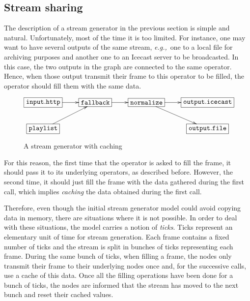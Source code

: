\documentclass{llncs}
\newcommand{\eg}{{\em e.g.,}}
\begin{document}
\subsection*{Stream sharing}

The description of a stream generator in the previous section is simple and 
natural. Unfortunately, most of the time it is too limited. For instance, one 
may want to have several outputs of the same 
stream, \eg\ one to a local file for archiving purposes and another one to an Icecast server to be
broadcasted.
In this case, the two outputs in the graph are connected to the same operator. Hence, when those output
transmit their frame to this operator to be filled, the operator should fill them with the same data.

\begin{figure}[htn]
 \begin{center}
\[
\xymatrix{
  *+[F]{\mathtt{input.http}}\ar[r]&*+[F]{\mathtt{fallback}}\ar[r]&
  *+[F]{\mathtt{normalize}}\ar[r]\ar[dr]&
  *+[F]{\mathtt{output.icecast}}\\
  *+[F]{\mathtt{playlist}}\ar[ur]& & & *+[F]{\mathtt{output.file}}\\
}
\]
\end{center}
 \caption{A stream generator with caching}
\end{figure}


For this reason, the first time that the operator is asked to fill the frame, it should pass it to its 
underlying operators, as described before. However, the second time, it should just fill the frame 
with the data gathered during the first call, which implies \textit{caching} the data obtained during the first call.

Therefore, even though the initial stream generator model could avoid copying data in memory, there 
are situations where it is not possible. In order to deal with these situations, the 
model carries a notion of \textit{ticks}. Ticks represent an elementary unit of time
for stream generation. Each frame contains a fixed number of ticks and the stream is split
in bunches of ticks representing each frame. During the same bunch of ticks, when filling a frame, the nodes only 
transmit their frame to their underlying nodes once and, for the successive calls, use a cache of this data. 
Once all the filling operations have been done for a bunch of ticks, the nodes are informed that the 
stream has moved to the next bunch and reset their cached values. 
\end{document}

